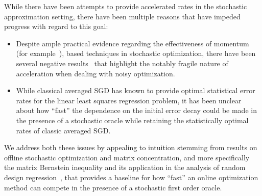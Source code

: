 While there have been attempts to provide accelerated rates in the stochastic approximation setting, there have been multiple reasons that have impeded progress with regard to this goal:
\begin{itemize}
\item Despite ample practical evidence regarding the effectiveness of momentum (for example~\cite{SutskeverMDH13}), based techniques in stochastic optimization, there have been several negative results~\cite{DevolderGN14} that highlight the notably fragile nature of acceleration when dealing with noisy optimization.
\item While classical averaged SGD has known to provide optimal statistical error rates for the linear least squares regression problem, it has been unclear about how ``fast'' the dependence on the initial error decay could be made in the presence of a stochastic oracle while retaining the statistically optimal rates of classic averaged SGD.
\end{itemize}
We address both these issues by appealing to intuition stemming from results on offline stochastic optimization and matrix concentration, and more specifically the matrix Bernstein inequality and its application in the analysis of random design regression~\cite{HsuKZ14}, that provides a baseline for how ``fast'' an online optimization method can compete in the presence of a stochastic first order oracle.